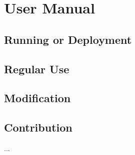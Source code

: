 \section{User Manual}
\label{sec:user-manual}

\subsection{Running or Deployment}


\subsection{Regular Use}


\subsection{Modification}


\subsection{Contribution}

...

